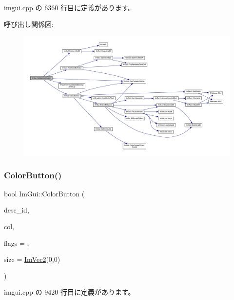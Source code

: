  imgui.\+cpp の 6360 行目に定義があります。

呼び出し関係図\+:\nopagebreak
\begin{figure}[H]
\begin{center}
\leavevmode
\includegraphics[width=350pt]{namespace_im_gui_a19f369fc61f49ab7995ebb4da99028db_cgraph}
\end{center}
\end{figure}
\mbox{\label{namespace_im_gui_a82b18bfe08594b76c08894848d1e6fce}} 
\subsubsection{\texorpdfstring{Color\+Button()}{ColorButton()}}
{\footnotesize\ttfamily bool Im\+Gui\+::\+Color\+Button (\begin{DoxyParamCaption}\item[{const char $\ast$}]{desc\+\_\+id,  }\item[{const \mbox{\hyperlink{struct_im_vec4}{Im\+Vec4}} \&}]{col,  }\item[{\mbox{\hyperlink{imgui_8h_a6b2d5e95adc38f22c021252189f669c6}{Im\+Gui\+Color\+Edit\+Flags}}}]{flags = {},  }\item[{\mbox{\hyperlink{struct_im_vec2}{Im\+Vec2}}}]{size = {\ttfamily \mbox{\hyperlink{struct_im_vec2}{Im\+Vec2}}(0,0)} }\end{DoxyParamCaption})}



 imgui.\+cpp の 9420 行目に定義があります。

